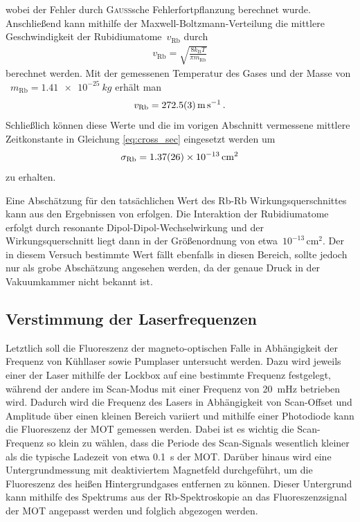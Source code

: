 \documentclass[11pt, a4paper]{article}
\numberwithin{equation}{section}
\begin{document}
wobei der Fehler durch \textsc{Gauß}sche Fehlerfortpflanzung berechnet wurde.
Anschließend kann mithilfe der Maxwell-Boltzmann-Verteilung die mittlere Geschwindigkeit der Rubidiumatome~$v_\mathrm{Rb}$ durch
\begin{align*}
	v_\mathrm{Rb} = \sqrt{\frac{8 k_\mathrm{B} T}{\pi m_\mathrm{Rb}}} 
\end{align*}
berechnet werden.
Mit der gemessenen Temperatur des Gases und der Masse von ~$m_\mathrm{Rb} = \SI{1.41e-25}{kg}$ \cite{handbook_spectroscopic_data} erhält man
\begin{align*}
	v_\mathrm{Rb} = \SI{272.5 +- 0.3}{\meter\per\second} \, \text{.}
\end{align*}
Schließlich können diese Werte und die im vorigen Abschnitt vermessene mittlere Zeitkonstante in Gleichung \eqref{eq:cross_sec} eingesetzt werden um
\begin{align*}
	\sigma_\mathrm{Rb} &= \SI{1.37 +- 0.26e-13}{\centi\meter\squared}\\
\end{align*}
zu erhalten.

Eine Abschätzung für den tatsächlichen Wert des Rb-Rb Wirkungsquerschnittes kann aus den Ergebnissen von \cite{force_in_mot} erfolgen.
Die Interaktion der Rubidiumatome erfolgt durch resonante Dipol-Dipol-Wechselwirkung und der Wirkungsquerschnitt liegt dann in der Größenordnung von etwa~$10^{-13} \, \si{\centi\meter\squared}$.
Der in diesem Versuch bestimmte Wert fällt ebenfalls in diesen Bereich, sollte jedoch nur als grobe Abschätzung angesehen werden, da der genaue Druck in der Vakuumkammer nicht bekannt ist.


\subsection{Verstimmung der Laserfrequenzen}
Letztlich soll die Fluoreszenz der magneto-optischen Falle in Abhängigkeit der Frequenz von Kühllaser sowie Pumplaser untersucht werden.
Dazu wird jeweils einer der Laser mithilfe der Lockbox auf eine bestimmte Frequenz festgelegt, während der andere im Scan-Modus mit einer Frequenz von \SI{20}{mHz} betrieben wird.
Dadurch wird die Frequenz des Lasers in Abhängigkeit von Scan-Offset und Amplitude über einen kleinen Bereich variiert und mithilfe einer Photodiode kann die Fluoreszenz der MOT gemessen werden.
Dabei ist es wichtig die Scan-Frequenz so klein zu wählen, dass die Periode des Scan-Signals wesentlich kleiner als die typische Ladezeit von etwa \SI{0.1}{s} der MOT.
Darüber hinaus wird eine Untergrundmessung mit deaktiviertem Magnetfeld durchgeführt, um die Fluoreszenz des heißen Hintergrundgases entfernen zu können.
Dieser Untergrund kann mithilfe des Spektrums aus der Rb-Spektroskopie an das Fluoreszenzsignal der MOT angepasst werden und folglich abgezogen werden.
\end{document}
